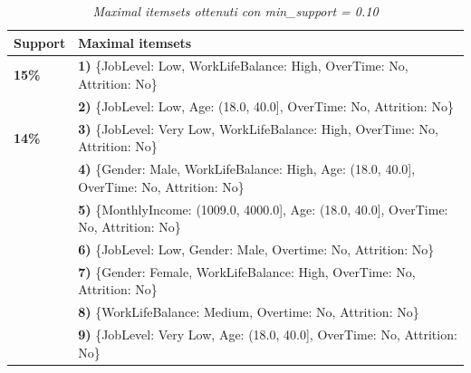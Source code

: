 \begin{table}
\centering
\small
\begin{tabular}{ |p{2cm}|p{10cm}|}
\hline
 \textbf{Support} & \textbf{Maximal itemsets} \\
 \hline
\textbf{15\%}& \textbf{1)} \{JobLevel: Low, WorkLifeBalance: High, OverTime: No, Attrition: No\}\\
& \textbf{2)} \{JobLevel: Low, Age: (18.0, 40.0], OverTime: No, Attrition: No\}\\
\hline
\textbf{14\%}& \textbf{3)} \{JobLevel: Very Low, WorkLifeBalance: High, OverTime: No, Attrition: No\}\\
& \textbf{4)} \{Gender: Male, WorkLifeBalance: High, Age: (18.0, 40.0], OverTime: No, Attrition: No\}\\
& \textbf{5)} \{MonthlyIncome: (1009.0, 4000.0], Age: (18.0, 40.0], OverTime: No, Attrition: No\}\\
& \textbf{6)} \{JobLevel: Low, Gender: Male, Overtime: No, Attrition: No\}\\
& \textbf{7)} \{Gender: Female, WorkLifeBalance: High, OverTime: No, Attrition: No\}\\
& \textbf{8)} \{WorkLifeBalance: Medium, Overtime: No, Attrition: No\}\\
& \textbf{9)} \{JobLevel: Very Low, Age: (18.0, 40.0], OverTime: No, Attrition: No\}\\
\hline
\end{tabular}
\caption{\textit{Maximal itemsets ottenuti con min\_support = 0.10}}
\label{Maximal Itemsets}
\end{table}

